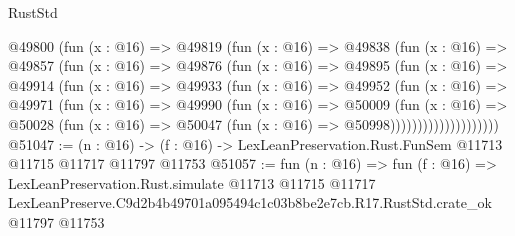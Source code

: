 \begin{lexlean}{RustStd}
\begin{coremodule}
              @49800
                (fun (x : @16) =>
                @49819
                  (fun (x : @16) =>
                  @49838
                    (fun (x : @16) =>
                    @49857
                      (fun (x : @16) =>
                      @49876
                        (fun (x : @16) =>
                        @49895
                          (fun (x : @16) =>
                          @49914
                            (fun (x : @16) =>
                            @49933
                              (fun (x : @16) =>
                              @49952
                                (fun (x : @16) =>
                                @49971
                                  (fun (x : @16) =>
                                  @49990
                                    (fun (x : @16) =>
                                    @50009
                                      (fun (x : @16) =>
                                      @50028
                                        (fun (x : @16) =>
                                        @50047 (fun (x : @16) => @50998))))))))))))))))))))
@51047 := (n : @16) ->
  (f : @16) -> LexLeanPreservation.Rust.FunSem @11713 @11715 @11717 @11797 @11753
@51057 := fun (n : @16) =>
  fun (f : @16) =>
  LexLeanPreservation.Rust.simulate
    @11713
    @11715
    @11717
    LexLeanPreserve.C9d2b4b49701a095494c1c03b8be2e7cb.R17.RustStd.crate_ok
    @11797
    @11753
\end{coremodule}
\end{lexlean}

